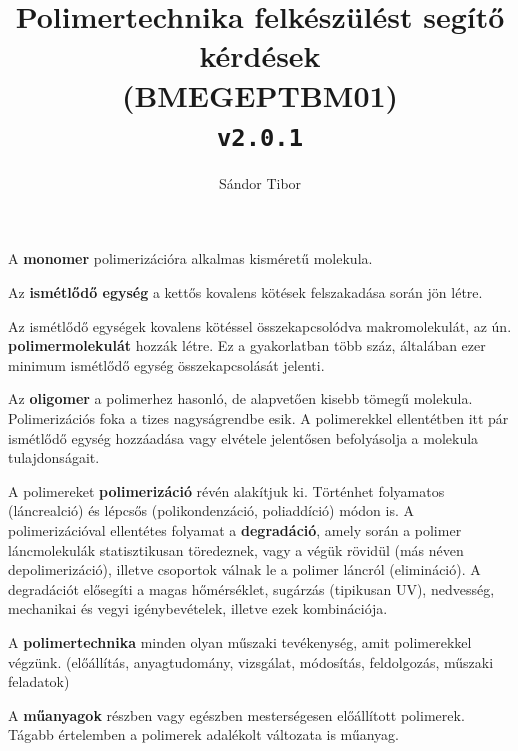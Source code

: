 \documentclass[12pt,a4paper]{article}       %
\title{
  Polimertechnika felkészülést segítő kérdések\\
  \large(BMEGEPTBM01)
  \\ \texttt{v2.0.1}
}
\author{Sándor Tibor}
\newcounter{questionctr}
\newenvironment{question}[1]{
  \refstepcounter{questionctr}
  \begin{tcolorbox}[
    colback=gray!25,
    colbacktitle=red!10!yellow!50,
    enhanced,
    sharp corners,
    boxrule=0mm,
    frame hidden,
    breakable,
    enhanced jigsaw,
    title={\textcolor{black}{\textsc{\# \thequestionctr{} – #1}}}
  ]


}{\end{tcolorbox}}
\begin{document}
\maketitle
\thispagestyle{fancy}

\begin{question}{
    Mi a polimer; monomer; oligomer? Mi a polimerizáció és mi a degradáció? Mi
    a polimertechnika? Mi a műanyag?
  }
  A \textbf{monomer} polimerizációra alkalmas kisméretű molekula.
  \tcbline

  Az \textbf{ismétlődő egység} a kettős kovalens kötések felszakadása során jön
  létre.
  \tcbline

  Az ismétlődő egységek kovalens kötéssel összekapcsolódva makromolekulát, az
  ún. \textbf{polimermolekulát} hozzák létre. Ez a gyakorlatban több száz,
  általában ezer minimum ismétlődő egység összekapcsolását jelenti.
  \tcbline

  Az \textbf{oligomer} a polimerhez hasonló, de alapvetően kisebb tömegű
  molekula. Polimerizációs foka a tizes nagyságrendbe esik. A polimerekkel
  ellentétben itt pár ismétlődő egység hozzáadása vagy elvétele jelentősen
  befolyásolja a molekula tulajdonságait.
  \tcbline

  A polimereket \textbf{polimerizáció} révén alakítjuk ki. Történhet folyamatos
  (láncrealció) és lépcsős (polikondenzáció, poliaddíció) módon is. A
  polimerizációval ellentétes folyamat a \textbf{degradáció}, amely során a
  polimer láncmolekulák statisztikusan töredeznek, vagy a végük rövidül (más
  néven depolimerizáció), illetve csoportok válnak le a polimer láncról
  (elimináció). A degradációt elősegíti a magas hőmérséklet, sugárzás
  (tipikusan UV), nedvesség, mechanikai és vegyi igénybevételek, illetve ezek
  kombinációja.
  \tcbline

  A \textbf{polimertechnika} minden olyan műszaki tevékenység, amit
  polimerekkel végzünk. (előállítás, anyagtudomány, vizsgálat, módosítás,
  feldolgozás, műszaki feladatok)
  \tcbline

  A \textbf{műanyagok} részben vagy egészben mesterségesen előállított
  polimerek. Tágabb értelemben a polimerek adalékolt változata is műanyag.
\end{question}
\end{document}
